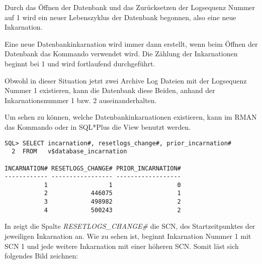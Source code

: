 
        Durch das Öffnen der Datenbank und das Zurücksetzen der Logsequenz Nummer auf 1 wird ein neuer Lebenszyklus der Datenbank begonnen, also eine neue Inkarnation.
        \begin{merke}
          Eine neue Datenbankinkarnation wird immer dann erstellt, wenn beim Öffnen der Datenbank das Kommando  verwendet wird. Die Zählung der Inkarnationen beginnt bei 1 und wird fortlaufend durchgeführt.
        \end{merke}
        Obwohl in dieser Situation jetzt zwei Archive Log Dateien mit der Logsequenz Nummer 1 existieren, kann die Datenbank diese Beiden, anhand der Inkarnationsnummer 1 bzw. 2 auseinanderhalten.

        \begin{merke}
          Um sehen zu können, welche Datenbankinkarnationen existieren, kann im RMAN das Kommando  oder in SQL*Plus die View   benutzt werden.
        \end{merke}

        \begin{lstlisting}[caption={Die View v\$database\_incarnation},label=admin1497,language=oracle_sql,emph={[9]CURRENT},emphstyle={[9]\color{black}}]
SQL> SELECT incarnation#, resetlogs_change#, prior_incarnation#
  2  FROM   v$database_incarnation

INCARNATION# RESETLOGS_CHANGE# PRIOR_INCARNATION#
------------ ----------------- ------------------
           1                 1                  0
           2            446075                  1
           3            498982                  2
           4            500243                  2

          \end{lstlisting}
\clearpage
          In  zeigt die Spalte \textit{RESETLOGS\_CHANGE\#}
          die SCN, des Startzeitpunktes der jeweiligen Inkarnation an. Wie zu
          sehen ist, beginnt Inkarnation Nummer 1 mit SCN 1 und jede weitere
          Inkarnation mit einer höheren SCN. Somit läst sich folgendes Bild
          zeichnen:


